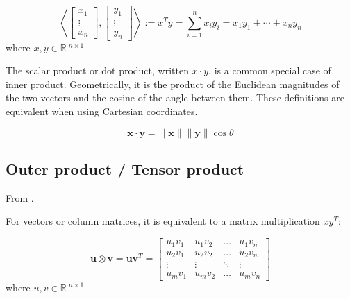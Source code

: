 \documentclass{article}
\begin{document}
\begin{equation}
    \left\langle\left[ \begin{array}{c}{ x_{1}} \\ {\vdots} \\ {x_{n}}\end{array}\right], \left[ \begin{array}{c}{y_{1}} \\ {\vdots} \\ {y_{n}}\end{array}\right]\right\rangle := x^{T} y=\sum_{i=1}^{n} x_{i} y_{i}=x_{1} y_{1}+\cdots+x_{n} y_{n}
\end{equation}
\noindent
where $x, y \in\mathbb{R}\:^{n \times 1}$

The scalar product or dot product, written $x \cdot y$, is a common special case of inner product. Geometrically, it is the product of the Euclidean magnitudes of the two vectors and the cosine of the angle between them. These definitions are equivalent when using Cartesian coordinates. 

\begin{equation}
    \mathbf{x} \cdot \mathbf{y}=\|\mathbf{x}\|\|\mathbf{y}\| \cos \theta
\end{equation}


\subsection{Outer product / Tensor product}
\label{subsec: Outer product}

From \cite{wiki2019outerProd}.

For vectors or column matrices, it is equivalent to a matrix multiplication $x y^{T}$:

\begin{equation}
    \mathbf{u} \otimes \mathbf{v} = \mathbf{u} \mathbf{v}^{T} = \left[ \begin{array}{cccc}{u_{1} v_{1}} & {u_{1} v_{2}} & {\ldots} & {u_{1} v_{n}} \\ {u_{2} v_{1}} & {u_{2} v_{2}} & {\dots} & {u_{2} v_{n}} \\ {\vdots} & {\vdots} & {\ddots} & {\vdots} \\ {u_{m} v_{1}} & {u_{m} v_{2}} & {\ldots} & {u_{m} v_{n}}\end{array}\right]
\end{equation}
\noindent
where $u, v \in\mathbb{R}\:^{n \times 1}$
\end{document}
